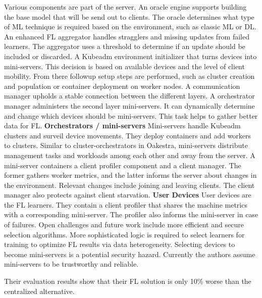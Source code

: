 Various components are part of the server.
An oracle engine supports building the base model that will be send out to clients.
The oracle determines what type of ML technique is required based on the environment, such as classic ML or DL.
An enhanced FL aggregator handles stragglers and missing updates from failed learners.
The aggregator uses a threshold to determine if an update should be included or discarded.
A Kubeadm environment initializer that turns devices into mini-servers.
This decision is based on available devices and the level of client mobility.
From there followup setup steps are performed, such as cluster creation and population or container deployment on worker nodes.
A communication manager upholds a stable connection between the different layers.
A orchestrator manager administers the second layer mini-servers.
It can dynamically determine and change which devices should be mini-servers.
This task helps to gather better data for FL.
\vspace{5mm}
\newline
\textbf{Orchestrators / mini-servers}\newline
Mini-servers handle Kubeadm clusters and surveil device movements.
They deploy containers and add workers to clusters.
Similar to cluster-orchestrators in Oakestra, mini-servers distribute management tasks and workloads among each other and away from the server.
A mini-server containers a client profiler component and a client manager.
The former gathers worker metrics, and the latter informs the server about changes in the environment.
Relevant changes include joining and leaving clients.
The client manager also protects against client starvation.
\vspace{5mm}
\newline
\textbf{User Devices}\newline
User devices are the FL learners.
They contain a client profiler that shares the machine metrics with a corresponding mini-server.
The profiler also informs the mini-server in case of failures.
\vspace{5mm}
\newline
Open challenges and future work include more efficient and secure selection algorithms.
More sophisticated logic is required to select learners for training to optimize FL results via data heterogeneity.
Selecting devices to become mini-servers is a potential security hazard.
Currently the authors assume mini-servers to be trustworthy and reliable.

Their evaluation results show that their FL solution is only 10\% worse than the centralized alternative.

